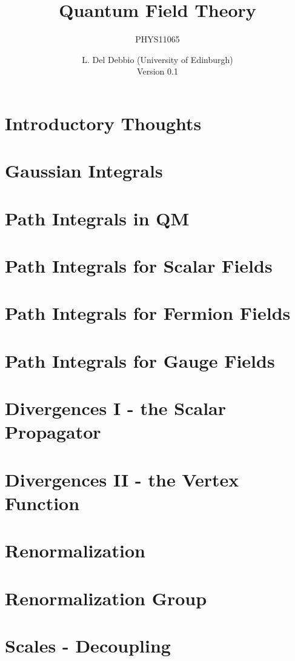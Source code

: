 \documentclass[11pt]{scrreprt}
\title{Quantum Field Theory}
\subtitle{PHYS11065}
\author{L. Del Debbio (University of Edinburgh)\\
  Version 0.1}
\begin{document}

\clearemptydoublepage
\tableofcontents
\clearemptydoublepage


\chapter{Introductory Thoughts}
\label{chap:intro}


\chapter{Gaussian Integrals}
\label{chap:lec0}


\chapter{Path Integrals in QM}
\label{chap:lec1}


\chapter{Path Integrals for Scalar Fields}
\label{cha:path-integr-scal}



\chapter{Path Integrals for Fermion Fields}
\label{cha:path-integr-ferm}


\chapter{Path Integrals for Gauge Fields}
\label{cha:path-integrals-gauge}



\chapter{Divergences I - the Scalar Propagator}
\label{cha:divergences-i-scalar}



\chapter{Divergences II - the Vertex Function}
\label{cha:diverg-ii-vert}



\chapter{Renormalization}
\label{cha:renormalization}



\chapter{Renormalization Group}
\label{cha:renorm-group}

\chapter{Scales - Decoupling}
\label{cha:scales-decoupling}

\printindex
\end{document}
